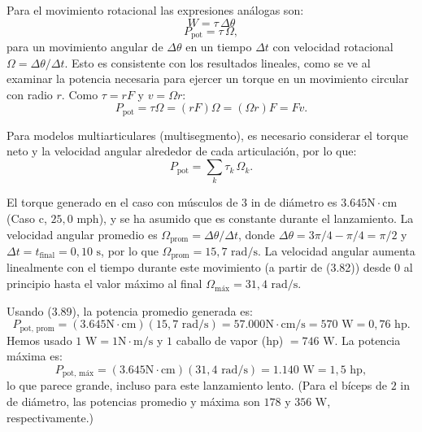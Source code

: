 \documentclass[12pt]{book}
\begin{document}
Para el movimiento rotacional las expresiones análogas son:
\begin{equation}
W = \tau\,\Delta\theta
\label{eq:3.88}
\end{equation}
\begin{equation}
P_{\text{pot}} = \tau\,\Omega,
\label{eq:3.89}
\end{equation}
para un movimiento angular de $\Delta\theta$ en un tiempo $\Delta t$ con velocidad rotacional $\Omega = \Delta\theta / \Delta t$. Esto es consistente con los resultados lineales, como se ve al examinar la potencia necesaria para ejercer un torque en un movimiento circular con radio $r$. Como $\tau = rF$ y $v = \Omega r$:
\begin{equation}
P_{\text{pot}} = \tau\Omega = (rF)\Omega = (\Omega r)F = Fv.
\label{eq:3.90}
\end{equation}

Para modelos multiarticulares (multisegmento), es necesario considerar el torque neto y la velocidad angular alrededor de cada articulación, por lo que:
\begin{equation}
P_{\text{pot}} = \sum_k \tau_k\,\Omega_k.
\label{eq:3.91}
\end{equation}

El torque generado en el caso con músculos de $3\text{ in}$ de diámetro es $3.645\text{N}\cdot\text{cm}$ (Caso c, $25{,}0\text{ mph}$), y se ha asumido que es constante durante el lanzamiento. La velocidad angular promedio es $\Omega_{\text{prom}} = \Delta\theta / \Delta t$, donde $\Delta\theta = 3\pi/4 - \pi/4 = \pi/2$ y $\Delta t = t_{\text{final}} = 0{,}10\text{ s}$, por lo que $\Omega_{\text{prom}} = 15{,}7\text{ rad/s}$. La velocidad angular aumenta linealmente con el tiempo durante este movimiento (a partir de (3.82)) desde $0$ al principio hasta el valor máximo al final $\Omega_{\text{máx}} = 31{,}4\text{ rad/s}$.

Usando (3.89), la potencia promedio generada es:
\begin{equation}
P_{\text{pot, prom}} = (3.645\text{N}\cdot\text{cm})(15{,}7\text{ rad/s}) = 57.000\text{N}\cdot\text{cm/s} = 570\text{ W} = 0{,}76\text{ hp}.
\label{eq:3.92}
\end{equation}
Hemos usado $1\text{ W} = 1\text{N}\cdot\text{m/s}$ y $1$ caballo de vapor (hp) $= 746\text{ W}$. La potencia máxima es:
\begin{equation}
P_{\text{pot, máx}} = (3.645\text{N}\cdot\text{cm})(31{,}4\text{ rad/s}) = 1.140\text{ W} = 1{,}5\text{ hp},
\label{eq:3.93}
\end{equation}
lo que parece grande, incluso para este lanzamiento lento. (Para el bíceps de $2\text{ in}$ de diámetro, las potencias promedio y máxima son $178$ y $356\text{ W}$, respectivamente.)
\end{document}

